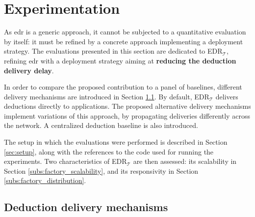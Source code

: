 \documentclass[sw]{iosart2x}
\newcommand{\edrt}{EDR$_{\mathcal{T}}$\xspace}
\begin{document}
\section{Experimentation}
\label{sec:experimentations}
As \gls{edr} is a generic approach, it cannot be subjected to a quantitative evaluation by itself: it must be refined by a concrete approach implementing a deployment strategy. 
The evaluations presented in this section are dedicated to \edrt, refining \gls{edr} with a deployment strategy aiming at \textbf{reducing the deduction delivery delay}.

In order to compare the proposed contribution to a panel of baselines, different delivery mechanisms are introduced in Section \textsection \ref{sec:deductions_propagation_strategies}. 
By default, \edrt delivers deductions directly to applications. 
The proposed alternative delivery mechanisms implement variations of this approach, by propagating deliveries differently across the network.
A centralized deduction baseline is also introduced.

The setup in which the evaluations were performed is described in Section \textsection \ref{sec:setup}, along with the references to the code used for running the experiments.
Two characteristics of \edrt are then assessed: its scalability in Section \textsection\ref{subs:factory_scalability}, and its responsivity in Section \textsection\ref{subs:factory_distribution}.

\subsection{Deduction delivery mechanisms}
\label{sec:deductions_propagation_strategies}
\end{document}

